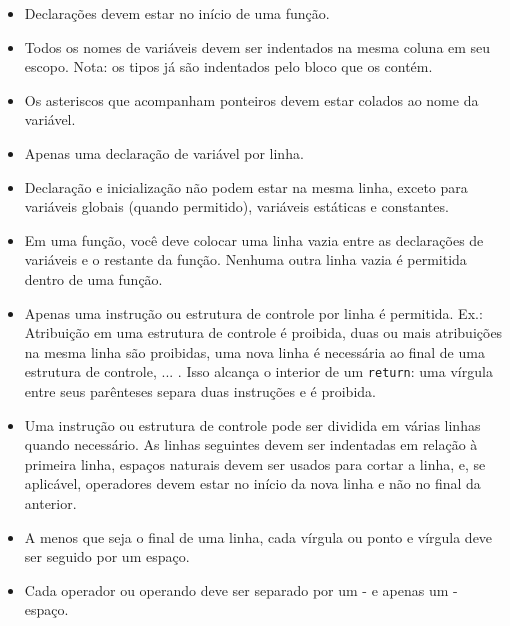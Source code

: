 \documentclass{42-pt}
\begin{document}
\begin{itemize}
            \item Declarações devem estar no início de uma função.

            \item Todos os nomes de variáveis devem ser indentados na mesma
            coluna em seu escopo. Nota: os tipos já são indentados pelo bloco que os contém.

            \item Os asteriscos que acompanham ponteiros devem estar colados
            ao nome da variável.

            \item Apenas uma declaração de variável por linha.

            \item Declaração e inicialização não podem estar
            na mesma linha, exceto para variáveis globais (quando permitido),
            variáveis estáticas e constantes.

            \item Em uma função, você deve colocar uma linha vazia entre
            as declarações de variáveis e o restante da função.
            Nenhuma outra linha vazia é permitida dentro de uma função.

            \item Apenas uma instrução ou estrutura de controle por linha é permitida. Ex.: Atribuição em
            uma estrutura de controle é proibida, duas ou mais atribuições na mesma linha são proibidas,
            uma nova linha é necessária ao final de uma estrutura de controle, ... . Isso alcança o
            interior de um \texttt{return}: uma vírgula entre seus parênteses separa duas
            instruções e é proibida.

            \item Uma instrução ou estrutura de controle pode ser dividida em várias linhas quando necessário.
            As linhas seguintes devem ser indentadas em relação à primeira linha,
            espaços naturais devem ser usados para cortar a linha, e, se aplicável, operadores devem estar
            no início da nova linha e não no final da anterior.

            \item A menos que seja o final de uma linha, cada vírgula ou ponto e vírgula
            deve ser seguido por um espaço.

            \item Cada operador ou operando deve ser separado por um
            - e apenas um - espaço.


\end{itemize}
\end{document}
